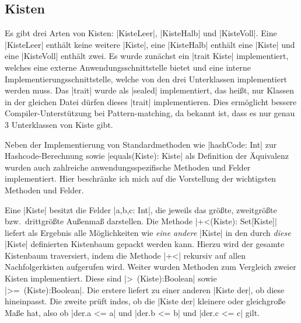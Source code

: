 \subsection{Kisten}
 Es gibt drei Arten von Kisten: |KisteLeer|, |KisteHalb| und |KisteVoll|.
 Eine |KisteLeer| enthält keine weitere |Kiste|, eine |KisteHalb| enthält eine |Kiste| und eine |KisteVoll| enthält zwei.
 Es wurde zunächst ein |trait Kiste| implementiert, welches eine externe Anwendungsschnittstelle bietet und eine interne Implementierungsschnittstelle,
 welche von den drei Unterklassen implementiert werden muss.
 Das |trait| wurde als |sealed| implementiert, das heißt, nur Klassen in der gleichen Datei dürfen dieses |trait| implementieren.
 Dies ermöglicht bessere Compiler-Unterstützung bei Pattern-matching, da bekannt ist, dass es nur genau 3 Unterklassen von Kiste gibt.

 Neben der Implementierung von Standardmethoden wie |hashCode: Int| zur Hashcode-Berechnung sowie |equals(Kiste): Kiste| als Definition der Äquivalenz
  wurden auch zahlreiche anwendungsspezifische Methoden und Felder implementiert.
 Hier beschränke ich mich auf die Vorstellung der wichtigsten Methoden und Felder.

 Eine |Kiste| besitzt die Felder |a,b,c: Int|, die jeweils das größte, zweitgrößte bzw.\ drittgrößte Außenmaß darstellen.
 Die Methode |+<(Kiste): Set[Kiste]| liefert als Ergebnis alle Möglichkeiten wie \emph{eine andere} |Kiste| in den durch \emph{diese} |Kiste| definierten Kistenbaum
  gepackt werden kann. Hierzu wird der gesamte Kistenbaum traversiert, indem die Methode |+<| rekursiv auf allen Nachfolgerkisten aufgerufen wird.
 Weiter wurden Methoden zum Vergleich zweier Kisten implementiert. Diese sind |>~(Kiste):Boolean| sowie |>=~(Kiste):Boolean|.
 Die erstere liefert zu einer anderen |Kiste der|, ob diese hineinpasst.
 Die zweite prüft indes, ob die |Kiste der| kleinere oder gleichgroße Maße hat, also ob |der.a <= a| und |der.b <= b| und |der.c <= c| gilt.
